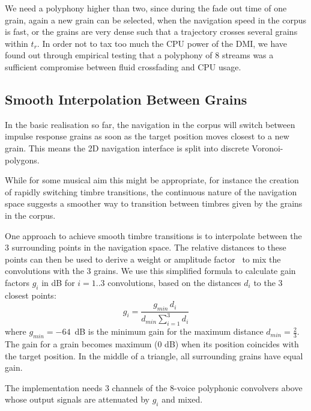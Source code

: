 We need a polyphony higher than two, since during the fade out time of one grain, again a new grain can be selected, when the navigation speed in the corpus is fast, or the grains are very dense such that a trajectory crosses several grains within $t_r$. In order not to tax too much the CPU power of the DMI, we have found out through empirical testing that a polyphony of 8 streams was a sufficient compromise between fluid crossfading and CPU usage.

\subsection{Smooth Interpolation Between Grains}\label{sec:mix}

In the basic realisation so far, the navigation in the corpus will switch between impulse response grains as soon as the target position moves closest to a new grain.  
This means the 2D navigation interface is split into discrete Voronoi-polygons.

While for some musical aim this might be appropriate, for instance the creation of rapidly switching timbre transitions, the continuous nature of the navigation space suggests a smoother way to transition between timbres given by the grains in the corpus.

One approach to achieve smooth timbre transitions is to interpolate between the 3 surrounding points in the navigation space.  The relative distances to these points can then be used to derive a weight or amplitude factor~\cite{FreedMacCallumSchmederWessel-nime2010-hybridization-interfaces} to mix the convolutions with the 3 grains.  We use this simplified formula to calculate gain factors $g_i$ in dB for $i = 1..3$ convolutions, based on the distances $d_i$ to the 3 closest points:
%
\begin{equation}
  g_i = \frac{g_{min} \, d_i}{d_{min} \sum_{i=1}^3 d_i}
\end{equation}
%
where $g_{min} = -64$~dB is the minimum gain for the maximum distance $d_{min} = \frac{2}{3}$.
The gain for a grain becomes maximum (0 dB) when its position coincides with the target position. In the middle of a triangle, all surrounding grains have equal gain.

The implementation needs 3 channels of the 8-voice polyphonic convolvers above whose output signals are attenuated by $g_i$ and mixed.  


